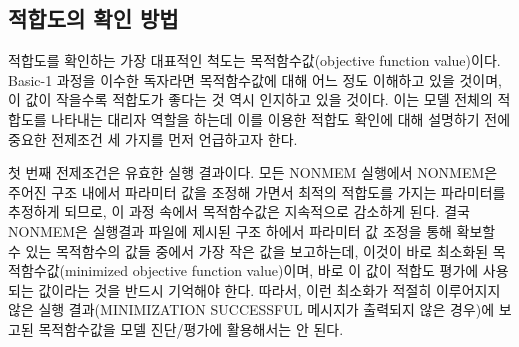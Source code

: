 \documentclass[
  11pt,
  krantz2,
  a4paper]{krantz}
\theoremstyle{definition}
\theoremstyle{definition}
\theoremstyle{definition}
\theoremstyle{remark}
\begin{document}

\hypertarget{uxc801uxd569uxb3c4uxc758-uxd655uxc778-uxbc29uxbc95}{%
\subsection{적합도의 확인 방법}\label{uxc801uxd569uxb3c4uxc758-uxd655uxc778-uxbc29uxbc95}}


적합도를 확인하는 가장 대표적인 척도는 목적함수값(objective function value)이다. Basic-1 과정을 이수한 독자라면 목적함수값에 대해 어느 정도 이해하고 있을 것이며, 이 값이 작을수록 적합도가 좋다는 것 역시 인지하고 있을 것이다. 이는 모델 전체의 적합도를 나타내는 대리자 역할을 하는데 이를 이용한 적합도 확인에 대해 설명하기 전에 중요한 전제조건 세 가지를 먼저 언급하고자 한다.

첫 번째 전제조건은 유효한 실행 결과이다. 모든 NONMEM 실행에서 NONMEM은 주어진 구조 내에서 파라미터 값을 조정해 가면서 최적의 적합도를 가지는 파라미터를 추정하게 되므로, 이 과정 속에서 목적함수값은 지속적으로 감소하게 된다. 결국 NONMEM은 실행결과 파일에 제시된 구조 하에서 파라미터 값 조정을 통해 확보할 수 있는 목적함수의 값들 중에서 가장 작은 값을 보고하는데, 이것이 바로 최소화된 목적함수값(minimized objective function value)이며, 바로 이 값이 적합도 평가에 사용되는 값이라는 것을 반드시 기억해야 한다. 따라서, 이런 최소화가 적절히 이루어지지 않은 실행 결과(MINIMIZATION SUCCESSFUL 메시지가 출력되지 않은 경우)에 보고된 목적함수값을 모델 진단/평가에 활용해서는 안 된다.
\end{document}
